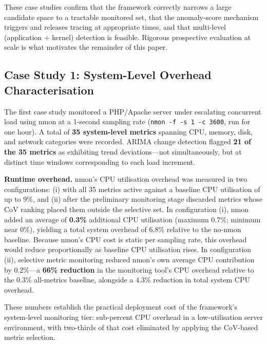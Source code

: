 \documentclass[pdflatex,sn-nature]{sn-jnl}
\theoremstyle{thmstyleone}%
\begin{document}
These case studies confirm that the framework correctly narrows a large
candidate space to a tractable monitored set, that the anomaly-score
mechanism triggers and releases tracing at appropriate times, and that
multi-level (application + kernel) detection is feasible.
Rigorous prospective evaluation at scale is what motivates the remainder
of this paper.

\subsection{Case Study 1: System-Level Overhead Characterisation}\label{sec:cs1}

The first case study monitored a PHP/Apache server under escalating concurrent
load using nmon at a 1-second sampling rate (\texttt{nmon -f -s 1 -c 3600},
run for one hour).
A total of \textbf{35 system-level metrics} spanning CPU, memory, disk, and
network categories were recorded.
ARIMA change detection flagged \textbf{21 of the 35 metrics} as exhibiting
trend deviations---not simultaneously, but at distinct time windows
corresponding to each load increment.

\textbf{Runtime overhead.}
nmon's CPU utilisation overhead was measured in two configurations: (i) with
all 35 metrics active against a baseline CPU utilisation of up to 9\%, and
(ii) after the preliminary monitoring stage discarded metrics whose CoV
ranking placed them outside the selective set.
In configuration (i), nmon added an average of \textbf{0.3\%} additional CPU
utilisation (maximum 0.7\%; minimum near 0\%), yielding a total
system overhead of 6.8\% relative to the no-nmon baseline.
Because nmon's CPU cost is static per sampling rate, this overhead would
reduce proportionally as baseline CPU utilisation rises.
In configuration (ii), selective metric monitoring reduced nmon's own
average CPU contribution by 0.2\%---a \textbf{66\% reduction} in the monitoring
tool's CPU overhead relative to the 0.3\% all-metrics baseline, alongside a
4.3\% reduction in total system CPU overhead.

These numbers establish the practical deployment cost of the framework's
system-level monitoring tier: sub-percent CPU overhead in a low-utilisation
server environment, with two-thirds of that cost eliminated by applying the
CoV-based metric selection.

\end{document}
